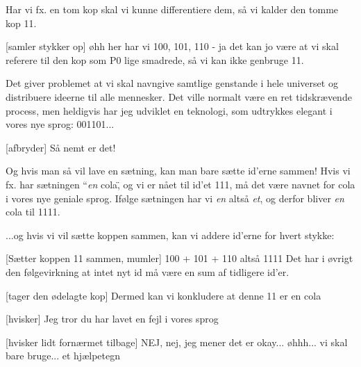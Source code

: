 \documentclass[a4paper,11pt]{article}
\begin{document}
\begin{sketch}
 Har vi fx. en tom kop  skal vi kunne differentiere dem, så vi kalder
den tomme kop 11.


[samler stykker op] øhh her har vi 100, 101, 110 - ja det kan jo være at vi skal referere til den
  kop som P0 lige smadrede, så vi kan ikke genbruge 11.


 Det giver problemet at vi skal navngive samtlige genstande i hele universet og distribuere ideerne til alle mennesker.
Det ville normalt være en ret tidskrævende process, men heldigvis har jeg udviklet en teknologi, som udtrykkes elegant i vores nye sprog:
001101...

[afbryder] Så nemt er det!

 Og hvis man så vil lave en sætning, kan man bare sætte id'erne sammen!
 Hvis vi fx. har sætningen ``\emph{en} cola\", og vi er nået til id'et 111, må det være navnet for cola i vores nye geniale sprog. Ifølge sætningen har vi \emph{en} altså \emph{et}, og derfor bliver \emph{en} cola til 1111.

 ...og hvis vi vil sætte koppen sammen, kan vi addere id'erne for hvert stykke:

[Sætter koppen 11 sammen, mumler] 100 + 101 + 110 altså 1111
 Det har i øvrigt den følgevirkning at intet nyt id må være en sum af tidligere id'er.

[tager den ødelagte kop] Dermed kan vi konkludere at denne 11 er en cola


[hvisker] Jeg tror du har lavet en fejl i vores sprog

[hvisker lidt fornærmet tilbage] NEJ, nej, jeg mener det er okay... øhhh... vi skal bare bruge... et hjælpetegn


\end{sketch}
\end{document}
